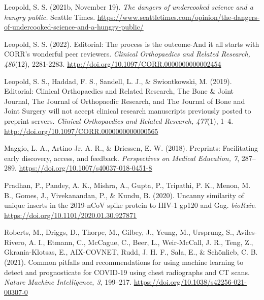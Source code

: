 \documentclass[authordate, empirical]{jote-new-article}
\begin{document}
	Leopold, S. S. (2021b, November 19). \emph{The dangers of undercooked science and a hungry public.} Seattle Times. \url{https://www.seattletimes.com/opinion/the-dangers-of-undercooked-science-and-a-hungry-public/}







	Leopold, S. S. (2022). Editorial: The process is the outcome-And it all starts with CORR's wonderful peer reviewers. \emph{Clinical Orthopaedics and Related Research, 480}(12), 2281-2283. \url{http://doi.org/10.1097/CORR.0000000000002454}







	Leopold, S. S., Haddad, F. S., Sandell, L. J., \& Swiontkowski, M. (2019). Editorial: Clinical Orthopaedics and Related Research, The Bone \& Joint Journal, The Journal of Orthopaedic Research, and The Journal of Bone and Joint Surgery will not accept clinical research manuscripts previously posted to preprint servers. \emph{Clinical Orthopaedics and Related Research, 477}(1), 1--4. \url{http://doi.org/10.1097/CORR.0000000000000565}







	Maggio, L. A., Artino Jr, A. R., \& Driessen, E. W. (2018). Preprints: Facilitating early discovery, access, and feedback. \emph{Perspectives on Medical Education, 7}, 287--289. \url{https://doi.org/10.1007/s40037-018-0451-8}







	Pradhan, P., Pandey, A. K., Mishra, A., Gupta, P., Tripathi, P. K., Menon, M. B., Gomes, J., Vivekanandan, P., \& Kundu, B. (2020). Uncanny similarity of unique inserts in the 2019-nCoV spike protein to HIV-1 gp120 and Gag. \emph{bioRxiv}. \url{https://doi.org/10.1101/2020.01.30.927871}







	Roberts, M., Driggs, D., Thorpe, M., Gilbey, J., Yeung, M., Ursprung, S., Aviles-Rivero, A. I., Etmann, C., McCague, C., Beer, L., Weir-McCall, J. R., Teng, Z., Gkrania-Klotsas, E., AIX-COVNET, Rudd, J. H. F., Sala, E., \& Schönlieb, C. B. (2021). Common pitfalls and recommendations for using machine learning to detect and prognosticate for COVID-19 using chest radiographs and CT scans. \emph{Nature Machine Intelligence, 3}, 199--217. \url{https://doi.org/10.1038/s42256-021-00307-0}
\end{document}
